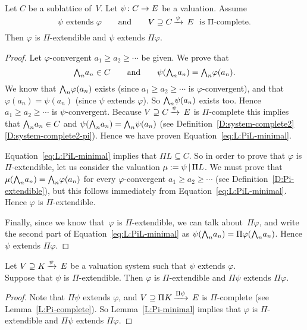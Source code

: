 \documentclass[main.tex]{subfiles}
\begin{document}
%
%
\begin{lem}
\label{L:Pi-minimal}
Let $C$ be a sublattice of~$V$.
Let $\psi\colon C\rightarrow E$ be a valuation.
Assume
\begin{equation*}
\psi\text{ extends }\varphi
\qquad\text{and}\qquad
V \supseteq C\,\smash{\xrightarrow{\psi}\,E}\ \text{ is $\Pi$-complete.}
\end{equation*}
Then $\varphi$ is $\Pi$-extendible and
$\psi$ extends $\Pi\varphi$.
\end{lem}
\begin{proof}
Let $\varphi$-convergent $a_1 \geq a_2 \geq \dotsb$
be given.
We prove that
\begin{equation}
\label{eq:L:PiL-minimal}
\textstyle{\bigwedge}_n a_n \in C\qquad\text{and}\qquad \psi (\textstyle{\bigwedge}_n a_n) = \textstyle{\bigwedge}_n \varphi(a_n).
\end{equation}
We know that $\textstyle{\bigwedge}_n \varphi (a_n)$ exists
(since $a_1 \geq a_2 \geq \dotsb$ is $\varphi$-convergent),
and that $\varphi(a_n)= \psi(a_n)$
(since $\psi$ extends $\varphi$).
So $\textstyle{\bigwedge}_n \psi(a_n)$ exists too.
Hence $a_1 \geq a_2 \geq \dotsb$ is $\psi$-convergent.
Because $V \supseteq C\,\smash{\xrightarrow{\psi}\,E}$ is $\Pi$-complete
this implies that $\textstyle{\bigwedge}_n a_n \in C$ and 
$\psi (\textstyle{\bigwedge}_n a_n) = \textstyle{\bigwedge}_n \psi(a_n)$
(see Definition~\ref{D:system-complete2}\ref{D:system-complete2-pi}).
Hence we have proven Equation~\eqref{eq:L:PiL-minimal}.

Equation~\eqref{eq:L:PiL-minimal} implies that $\Pi L \subseteq C$.
So in order to prove that $\varphi$
is $\Pi$-extendible,
let us consider the valuation $\mu := \psi \,|\,\Pi L$.
We must prove that
$\mu(\textstyle{\bigwedge}_n a_n) = \textstyle{\bigwedge}_n \varphi(a_n)$
for every $\varphi$-convergent $a_1 \geq a_2 \geq \dotsb$
(see Definition~\ref{D:Pi-extendible}),
but this follows immediately from Equation~\eqref{eq:L:PiL-minimal}.
Hence $\varphi$ is $\Pi$-extendible.

Finally,
since we know that~$\varphi$ is $\Pi$-extendible,
we can talk about~$\Pi\varphi$,
and write the second part of
Equation~\eqref{eq:L:PiL-minimal}
as $\psi(\textstyle{\bigwedge}_n a_n) = \Pi \varphi(\textstyle{\bigwedge}_n a_n)$.
Hence $\psi$ extends $\Pi\varphi$.
\end{proof}
%
%
\begin{lem}
\label{L:Pi-monotonous}
Let $V \supseteq K\,\smash{\xrightarrow{\psi}\,E}$ be
a valuation system
such that $\psi$ extends $\varphi$.\\
Suppose that $\psi$ is $\Pi$-extendible.
Then $\varphi$ is $\Pi$-extendible
and  $\Pi\psi$ extends $\Pi\varphi$.
\end{lem}
\begin{proof}
Note that $\Pi\psi$ extends $\varphi$,
and $V \supseteq \Pi K\,\smash{\xrightarrow{\Pi \psi}\,E}$
is $\Pi$-complete (see Lemma~\ref{L:Pi-complete}).
So Lemma~\ref{L:Pi-minimal}
implies that
$\varphi$ is $\Pi$-extendible
and $\Pi\psi$ extends $\Pi\varphi$.
\end{proof}
\end{document}
